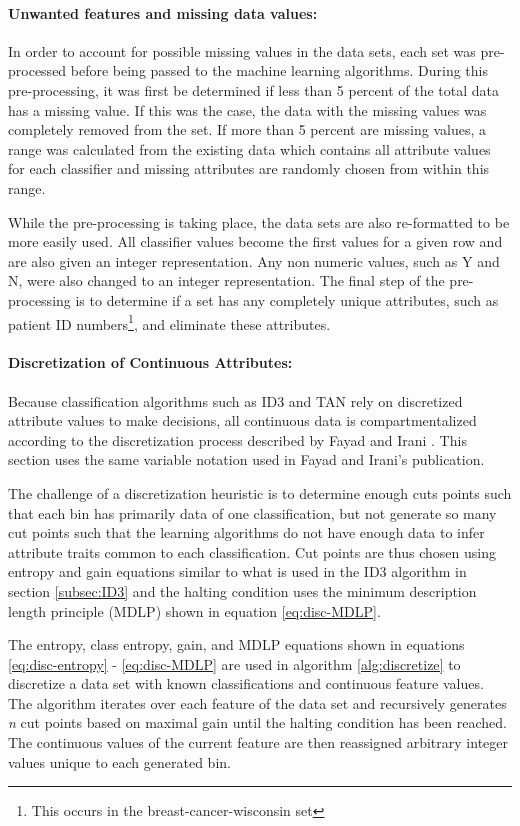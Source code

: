 \paragraph{Unwanted features and missing data values:} 
 In order to account for possible missing values in the data sets, each set was pre-processed before being passed to the machine learning algorithms.  
During this pre-processing, it was first be determined if less than 5 percent of the total data has a missing value. 
If this was the case, the data with the missing values was completely removed from the set. 
If more than 5 percent are missing values, a range was calculated from the existing data which contains all attribute values for each classifier and missing attributes are randomly chosen from within this range.  

While the pre-processing is taking place, the data sets are also re-formatted to be more easily used.
All classifier values become the first values for a given row and are also given an integer representation.  
Any non numeric values, such as Y and N, were also changed to an integer representation. 
The final step of the pre-processing is to determine if a set has any completely unique attributes, such as patient ID numbers\footnote{This occurs in the breast-cancer-wisconsin set}, and eliminate these attributes.

\paragraph{Discretization of Continuous Attributes:}
Because classification algorithms such as ID3 and TAN rely on discretized attribute values to make decisions, all continuous data is compartmentalized according to the discretization process described by Fayad and Irani \cite{FayyadIrani}.
This section uses the same variable notation used in Fayad and Irani's publication.

The challenge of a discretization heuristic is to determine enough cuts points such that each bin has primarily data of one classification, but not generate so many cut points such that the learning algorithms do not have enough data to infer attribute traits common to each classification.
Cut points are thus chosen using entropy and gain equations similar to what is used in the ID3 algorithm in section \ref{subsec:ID3} and the halting condition uses the minimum description length principle (MDLP) shown in equation \ref{eq:disc-MDLP}.

The entropy, class entropy, gain, and MDLP equations shown in equations \ref{eq:disc-entropy} - \ref{eq:disc-MDLP} are used in algorithm \ref{alg:discretize} to discretize a data set with known classifications and continuous feature values.
The algorithm iterates over each feature of the data set and recursively generates \textit{n} cut points based on maximal gain until the halting condition has been reached.
The continuous values of the current feature are then reassigned arbitrary integer values unique to each generated bin.

